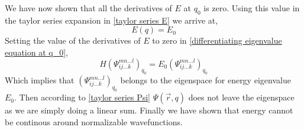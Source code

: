 \documentclass[a4paper, 11pt]{article}
\begin{document}
We have now shown that all the derivatives of $E$ at $q_0$ is zero. Using this value in the taylor
series expansion in \eqref{taylor series E} we arrive at,
\begin{equation}
	E(q) = E_0
\end{equation}
Setting the value of the derivatives of $E$ to zero in \eqref{differentiating eigenvalue equation at
q_0},
\begin{equation}
	H (\Psi_{i j \ldots k}^{m n \ldots l})_{q_0} = E_0 (\Psi_{i j \ldots k}^{m n \ldots l})_{q_0}
\end{equation}
Which implies that $(\Psi_{i j \ldots k}^{m n \ldots l})_{q_0}$ belongs to the eigenspace for energy
eigenvalue $E_0$. Then according to \eqref{taylor series Psi} $\Psi(\vec{r}, q)$ does not leave the
eigenspace as we are simply doing a linear sum. Finally we have shown that energy cannot be
continous around normalizable wavefunctions.
\end{document}
